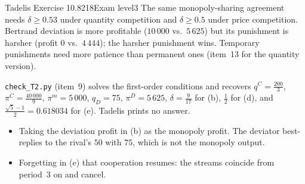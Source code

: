 \begin{exsol}{Tadelis Exercise 10.8}{218}{Exam level}{3}
\interp The same monopoly-sharing agreement needs $\delta \ge 0.53$ under quantity competition and
$\delta \ge 0.5$ under price competition. Bertrand deviation is more profitable ($10\,000$ vs.\ $5\,625$) but
its punishment is harsher (profit $0$ vs.\ $4\,444$); the harsher punishment wins. Temporary punishments
need more patience than permanent ones (item~13 for the quantity version).

\verify \texttt{check\_T2.py} (item~9) solves the first-order conditions and recovers $q^C = \frac{200}{3}$,
$\pi^C = \frac{40\,000}{9}$, $\pi^m = 5\,000$, $q_D = 75$, $\pi^D = 5\,625$, $\delta = \frac9{17}$ for (b),
$\frac12$ for (d), and $\frac{\sqrt5-1}{2} = 0.618034$ for (e). Tadelis prints no answer.

\mistakes
\begin{itemize}
  \item Taking the deviation profit in (b) as the monopoly profit. The deviator best-replies to the
  rival's $50$ with $75$, which is not the monopoly output.
  \item Forgetting in (e) that cooperation resumes: the streams coincide from period~3 on and cancel.
\end{itemize}

\end{exsol}
